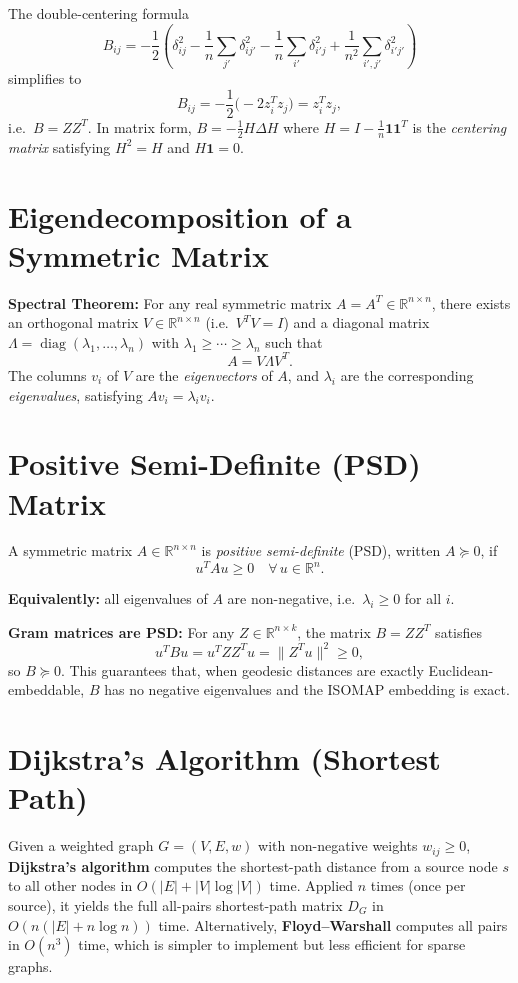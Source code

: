 \documentclass[11pt]{article}
\begin{document}
The double-centering formula
\[
  B_{ij} = -\frac{1}{2}\left(\delta_{ij}^2
    - \frac{1}{n}\sum_{j'}\delta_{ij'}^2
    - \frac{1}{n}\sum_{i'}\delta_{i'j}^2
    + \frac{1}{n^2}\sum_{i',j'}\delta_{i'j'}^2\right)
\]
simplifies to
\[
  B_{ij} = -\frac{1}{2}\bigl(-2z_i^T z_j\bigr) = z_i^T z_j,
\]
i.e.\ $B = ZZ^T$. In matrix form, $B = -\tfrac{1}{2}H\Delta H$ where
$H = I - \tfrac{1}{n}\mathbf{1}\mathbf{1}^T$ is the \emph{centering matrix}
satisfying $H^2 = H$ and $H\mathbf{1} = 0$.

\section{Eigendecomposition of a Symmetric Matrix}
\label{app:eigen}

\textbf{Spectral Theorem:} For any real symmetric matrix $A = A^T \in \mathbb{R}^{n
\times n}$, there exists an orthogonal matrix $V \in \mathbb{R}^{n \times n}$
(i.e.\ $V^TV = I$) and a diagonal matrix $\Lambda =
\operatorname{diag}(\lambda_1,\dots,\lambda_n)$ with $\lambda_1 \geq \cdots \geq
\lambda_n$ such that
\[
  A = V\Lambda V^T.
\]
The columns $v_i$ of $V$ are the \emph{eigenvectors} of $A$, and $\lambda_i$ are
the corresponding \emph{eigenvalues}, satisfying $Av_i = \lambda_i v_i$.

\section{Positive Semi-Definite (PSD) Matrix}
\label{app:psd}

A symmetric matrix $A \in \mathbb{R}^{n\times n}$ is \emph{positive semi-definite}
(PSD), written $A \succeq 0$, if
\[
  u^T A u \geq 0 \quad \forall\, u \in \mathbb{R}^n.
\]

\textbf{Equivalently:} all eigenvalues of $A$ are non-negative, i.e.\ $\lambda_i
\geq 0$ for all $i$.

\textbf{Gram matrices are PSD:} For any $Z \in \mathbb{R}^{n \times k}$, the matrix
$B = ZZ^T$ satisfies
\[
  u^T B u = u^T ZZ^T u = \|Z^Tu\|^2 \geq 0,
\]
so $B \succeq 0$. This guarantees that, when geodesic distances are exactly
Euclidean-embeddable, $B$ has no negative eigenvalues and the ISOMAP embedding is
exact.

\section{Dijkstra's Algorithm (Shortest Path)}
\label{app:dijkstra}

Given a weighted graph $G = (V, E, w)$ with non-negative weights $w_{ij} \geq 0$,
\textbf{Dijkstra's algorithm} computes the shortest-path distance from a source node
$s$ to all other nodes in $O(|E| + |V|\log|V|)$ time. Applied $n$ times (once per
source), it yields the full all-pairs shortest-path matrix $D_G$ in
$O(n(|E| + n\log n))$ time. Alternatively, \textbf{Floyd–Warshall} computes all
pairs in $O(n^3)$ time, which is simpler to implement but less efficient for sparse
graphs.
\end{document}
